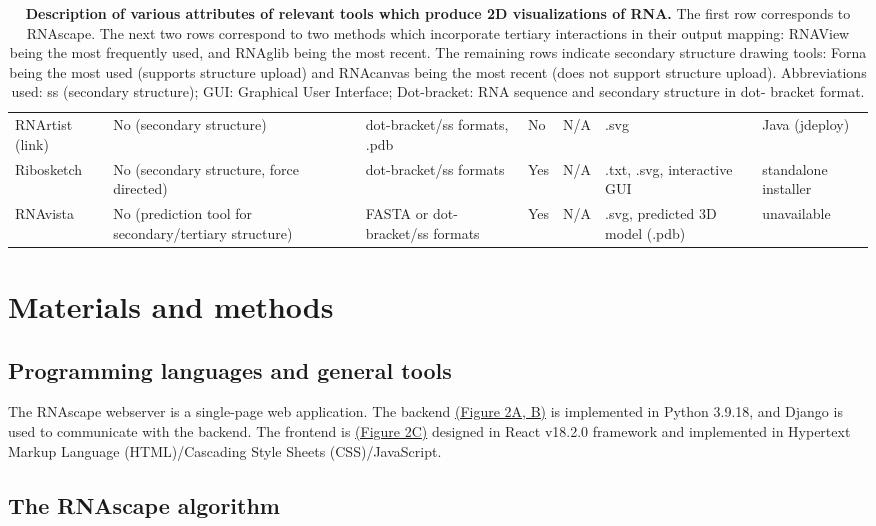 \begin{table}[]
{\begin{tabular}{lllllll}
RNArtist (link) & No (secondary structure) & dot-bracket/ss formats, .pdb & No & N/A & .svg & Java (jdeploy) \\
Ribosketch \citep{Lu2018} & No (secondary structure, force   directed) & dot-bracket/ss formats & Yes & N/A & .txt, .svg, interactive GUI & standalone installer \\
RNAvista \citep{antczak2019rnavista} & No (prediction tool for secondary/tertiary   structure) & FASTA or dot-bracket/ss formats & Yes & N/A & .svg, predicted 3D model (.pdb) & unavailable
\end{tabular}%
}
\caption[Description of various attributes of relevant tools which produce 2D visualizations of RNA.]{\textbf{Description of various attributes of relevant tools which produce 2D visualizations of RNA.} The first row corresponds to RNAscape. The next two rows correspond to two methods which incorporate tertiary interactions in their output mapping: RNAView \citep{Yang2003} being the most
frequently used, and RNAglib \citep{Mallet2022} being the most recent. The remaining rows indicate secondary
structure drawing tools: Forna \citep{Kerpedjiev2015} being the most used (supports structure upload) and RNAcanvas \citep{Johnson2023} being the most recent (does not support structure upload). Abbreviations used: ss (secondary
structure); GUI: Graphical User Interface; Dot-bracket: RNA sequence and secondary structure in dot-
bracket format.}
\end{table}

\section{Materials and methods} 

\subsection{Programming languages and general tools}

The RNAscape webserver is a single-page web application. The backend \hyperref[fig:rnascape2]{(Figure 2A, B)} is implemented in Python 3.9.18, and Django \citep{Django2019} is used to communicate with the backend. The frontend is \hyperref[fig:rnascape2]{(Figure 2C)} designed in React v18.2.0 framework and implemented in Hypertext Markup Language (HTML)/Cascading Style Sheets (CSS)/JavaScript.

\subsection{The RNAscape algorithm}

